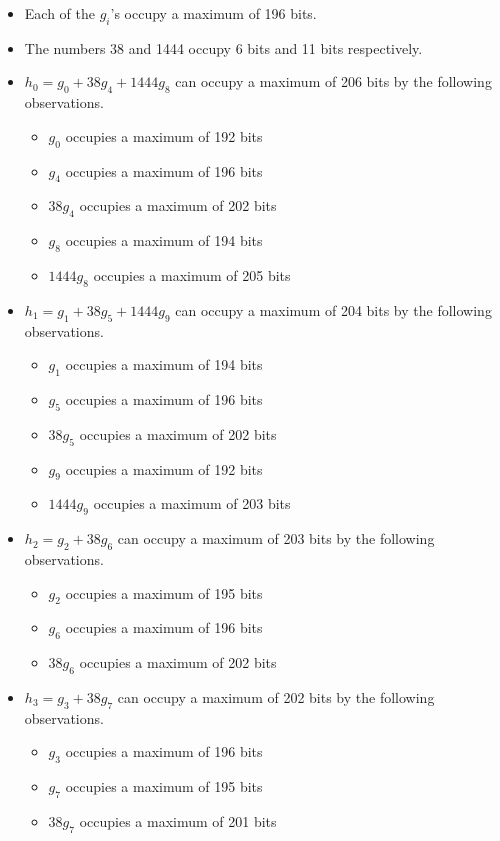 \documentclass[a4paper, 12pt]{article}
\begin{document}
\begin{itemize}
  \item Each of the $g_i$'s occupy a maximum of 196 bits.
  \item The numbers 38 and 1444 occupy 6 bits and 11 bits respectively.
  \item $h_0 = g_0 + 38 g_4 + 1444 g_8$ can occupy a maximum of 206 bits by the following observations.
    \begin{itemize}
      \item $g_0$ occupies a maximum of 192 bits
      \item $g_4$ occupies a maximum of 196 bits
      \item $38g_4$ occupies a maximum of 202 bits
      \item $g_8$ occupies a maximum of 194 bits
      \item $1444g_8$ occupies a maximum of 205 bits
    \end{itemize}
  \item $h_1 = g_1 + 38 g_5 + 1444 g_9$ can occupy a maximum of 204 bits by the following observations.
    \begin{itemize}
      \item $g_1$ occupies a maximum of 194 bits
      \item $g_5$ occupies a maximum of 196 bits
      \item $38g_5$ occupies a maximum of 202 bits
      \item $g_9$ occupies a maximum of 192 bits
      \item $1444g_9$ occupies a maximum of 203 bits
    \end{itemize}
  \item $h_2 = g_2 + 38 g_6$ can occupy a maximum of 203 bits by the following observations.
    \begin{itemize}
      \item $g_2$ occupies a maximum of 195 bits
      \item $g_6$ occupies a maximum of 196 bits
      \item $38g_6$ occupies a maximum of 202 bits
    \end{itemize}
  \item $h_3 = g_3 + 38 g_7$ can occupy a maximum of 202 bits by the following observations.
    \begin{itemize}
      \item $g_3$ occupies a maximum of 196 bits
      \item $g_7$ occupies a maximum of 195 bits
      \item $38g_7$ occupies a maximum of 201 bits

\end{itemize}
\end{itemize}
\end{document}
